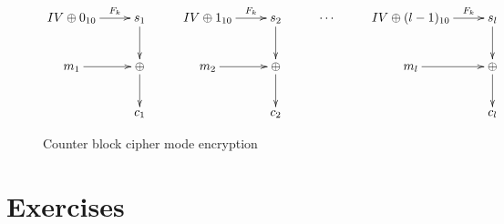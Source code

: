 \documentclass{book}
\theoremstyle{plain}
\theoremstyle{definition}
\begin{document}
\begin{figure}[h]
\begin{center}
$$\xymatrix{
IV \oplus 0_{10} \ar[r]^-{F_k} & s_1 \ar[d] & IV \oplus 1_{10} \ar[r]^-{F_k} & s_2 \ar[d] & \cdots & IV \oplus (l-1)_{10} \ar[r]^-{F_k} & s_l \ar[d] \\
m_1 \ar[r] & \oplus \ar[d] & m_2 \ar[r] & \oplus \ar[d] & & m_l \ar[r] & \oplus \ar[d] \\
& c_1 & & c_2 & & & c_l
}$$
\caption{Counter block cipher mode encryption}
\label{fig:ctr}
\end{center}
\end{figure}

\section{Exercises}
\end{document}
